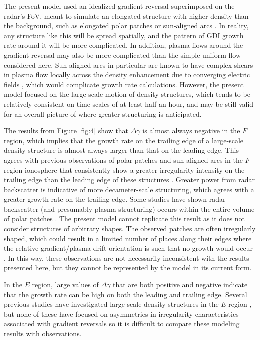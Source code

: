 The present model used an idealized gradient reversal superimposed on the radar's FoV, meant to simulate an elongated structure with higher density than the background, such as elongated polar patches \citep{Hosokawa2014} or sun-aligned arcs \citep{Koustov2012}.  In reality, any structure like this will be spread spatially, and the pattern of GDI growth rate around it will be more complicated.  In addition, plasma flows around the gradient reversal may also be more complicated than the simple uniform flow considered here.  Sun-aligned arcs in particular are known to have complex shears in plasma flow locally across the density enhancement due to converging electric fields \citep[e.g.][]{Kozlovsky2007}, which would complicate growth rate calculations. However, the present model focused on the large-scale motion of density structures, which tends to be relatively consistent on time scales of at least half an hour, and may be still valid for an overall picture of where greater structuring is anticipated.


The results from Figure \ref{fig:4} show that \(\Delta\gamma\) is almost always negative in the \(F\) region, which implies that the growth rate on the trailing edge of a large-scale density structure is almost always larger than that on the leading edge.  This agrees with previous observations of polar patches and sun-aligned arcs in the \(F\) region ionosphere that consistently show a greater irregularity intensity on the trailing edge than the leading edge of these structures \citep{Weber1984,Milan2002a,Koustov2012}.  Greater power from radar backscatter is indicative of more decameter-scale structuring, which agrees with a greater growth rate on the trailing edge.  Some studies have shown radar backscatter (and presumably plasma structuring) occurs within the entire volume of polar patches \citep{Hosokawa2009}.  The present model cannot replicate this result as it does not consider structures of arbitrary shapes.  The observed patches are often irregularly shaped, which could result in a limited number of places along their edges where the relative gradient/plasma drift orientation is such that no growth would occur \citep{Hosokawa2009}.  In this way, these observations are not necessarily inconsistent with the results presented here, but they cannot be represented by the model in its current form.

In the \(E\) region, large values of \(\Delta\gamma\) that are both positive and negative indicate that the growth rate can be high on both the leading and trailing edge.  Several previous studies have investigated large-scale density structures in the \(E\) region \citep{Milan1999b,Milan2001a,Milan2002a}, but none of these have focused on asymmetries in irregularity characteristics associated with gradient reversals so it is difficult to compare these modeling results with observations.  

